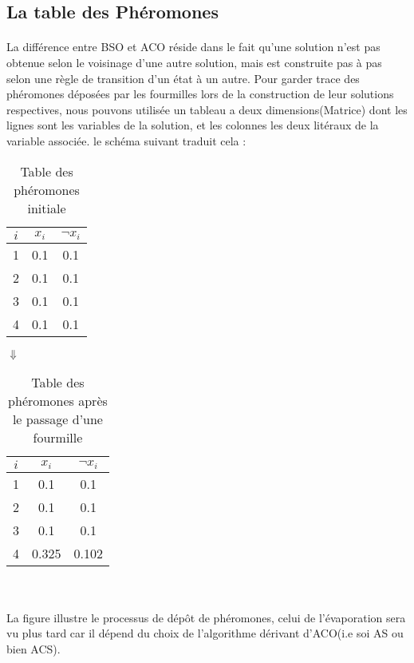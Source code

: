 	
	\subsection{La table des Phéromones}
	\paragraph{}
	La différence entre BSO et ACO réside dans le fait qu'une solution n'est pas obtenue selon le voisinage d'une autre solution, mais est construite pas à pas selon une règle de transition d'un état à un autre. Pour garder trace des phéromones déposées par les fourmilles lors de la construction de leur solutions respectives, nous pouvons utilisée un tableau a deux dimensions(Matrice) dont les lignes sont les variables de la solution, et les colonnes les deux litéraux de la variable associée. le schéma suivant traduit cela : 
	
	\begin{minipage}{\textwidth}
		\centering
		\begin{table}[H]
			\centering
			\begin{tabular}{|c|c|c|}
				\hline
				$i$ & $x_{i}$ & $\lnot x_{i}$ \\ \hline
				1   & 0.1     & 0.1           \\ \hline
				2   & 0.1     & 0.1           \\ \hline
				3   & 0.1     & 0.1           \\ \hline
				4   & 0.1     & 0.1           \\ \hline
			\end{tabular}
			\caption{Table des phéromones initiale}
		\end{table}
		$\Downarrow$
		\begin{table}[H]
			\centering
			\begin{tabular}{|c|c|c|}
				\hline
				$i$ & $x_{i}$ & $\lnot x_{i}$ \\ \hline
				1   & 0.1     & 0.1           \\ \hline
				2   & 0.1     & 0.1           \\ \hline
				3   & 0.1     & 0.1           \\ \hline
				4   & 0.325     & 0.102           \\ \hline
			\end{tabular}
			\caption{Table des phéromones après le passage d'une fourmille}
		\end{table}
	\end{minipage}
	\\~\\
	La figure illustre le processus de dépôt de phéromones, celui de l'évaporation sera vu plus tard car il dépend du choix de l'algorithme dérivant d'ACO(i.e soi AS ou bien ACS).
